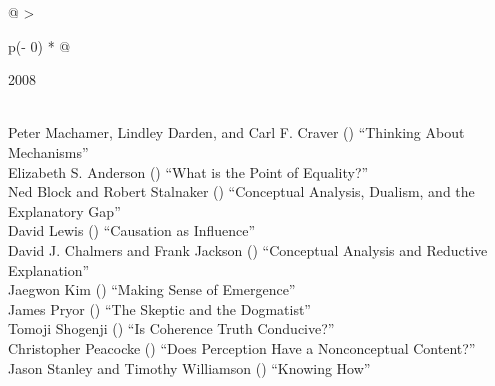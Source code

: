 \documentclass[
  10pt,
  letterpaper,
  DIV=11,
  numbers=noendperiod,
  twoside]{scrartcl}
\begin{document}
\begin{longtable}[]{@{}
  >{\raggedright\arraybackslash}p{(\columnwidth - 0\tabcolsep) * }@{}}

\caption{\label{tbl-top-ten-1999}Most cited articles published less than
ten years ago as of 2008.}

\tabularnewline

\toprule\noalign{}
\begin{minipage}[b]{\linewidth}\raggedright
2008
\end{minipage} \\
\midrule\noalign{}
\endhead
\bottomrule\noalign{}
\endlastfoot
Peter Machamer, Lindley Darden, and Carl F. Craver
()
``Thinking About Mechanisms'' \\
Elizabeth S. Anderson
()
``What is the Point of Equality?'' \\
Ned Block and Robert Stalnaker
()
``Conceptual Analysis, Dualism, and the Explanatory Gap'' \\
David Lewis
()
``Causation as Influence'' \\
David J. Chalmers and Frank Jackson
()
``Conceptual Analysis and Reductive Explanation'' \\
Jaegwon Kim
()
``Making Sense of Emergence'' \\
James Pryor
()
``The Skeptic and the Dogmatist'' \\
Tomoji Shogenji
()
``Is Coherence Truth Conducive?'' \\
Christopher Peacocke
()
``Does Perception Have a Nonconceptual Content?'' \\
Jason Stanley and Timothy Williamson
()
``Knowing How'' \\

\end{longtable}
\end{document}
